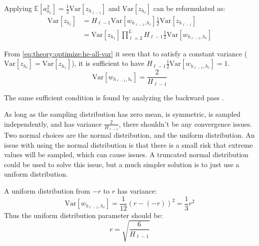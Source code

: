 Applying $\mathbb{E}[a_{h_\ell}^2] = \frac{1}{2} \mathrm{Var}[z_{h_{\ell-1}}]$ and $\mathrm{Var}[z_{h_\ell}]$ can be reformulated as:
\begin{equation}
\begin{aligned}
\mathrm{Var}[z_{h_\ell}] &= H_{\ell-1} \mathrm{Var}[w_{h_{\ell-1}, h_{\ell}}] \frac{1}{2} \mathrm{Var}[z_{h_{\ell-1}}] \\
&= \mathrm{Var}[z_{h_1}] \prod_{\ell=2}^L H_{\ell-1} \frac{1}{2} \mathrm{Var}[w_{h_{\ell-1}, h_{\ell}}]
\end{aligned}
\label{eq:theory:optimize:he-all-var}
\end{equation}

From \eqref{eq:theory:optimize:he-all-var} it seen that to satisfy a constant variance ($\mathrm{Var}[z_{h_\ell}] = \mathrm{Var}[z_{h_1}]$), it is sufficient to have ${H_{\ell-1} \frac{1}{2} \mathrm{Var}[w_{h_{\ell-1}, h_{\ell}}] = 1}$.
\begin{equation}
\mathrm{Var}[w_{h_{\ell-1}, h_{\ell}}] = \frac{2}{H_{\ell-1}}
\end{equation}

The same sufficient condition is found by analyzing the backward pass \cite{he-initialization}.

As long as the sampling distribution has zero mean, is symmetric, is sampled independently, and has variance $\frac{2}{H_{\ell-1}}$, there shouldn't be any convergence issues. Two normal choices are the normal distribution, and the uniform distribution. An issue with using the normal distribution is that there is a small risk that extreme values will be sampled, which can cause issues. A truncated normal distribution could be used to solve this issue, but a much simpler solution is to just use a uniform distribution.

A uniform distribution from $-r$ to $r$ has variance:
\begin{equation}
\mathrm{Var}[w_{h_{\ell-1}, h_{\ell}}] = \frac{1}{12} (r - (-r))^2 = \frac{1}{3} r^2
\end{equation}
Thus the uniform distribution parameter should be:
\begin{equation}
r = \sqrt{\frac{6}{H_{\ell-1}}}
\end{equation}

